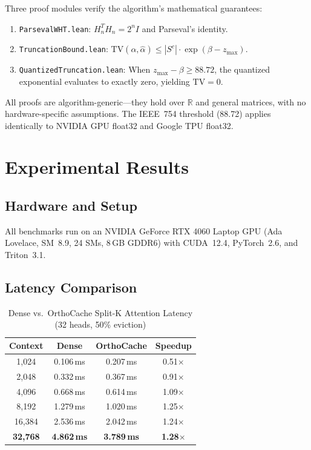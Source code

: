 \documentclass[conference]{IEEEtran}
\begin{document}
Three proof modules verify the algorithm's mathematical guarantees:

\begin{enumerate}
\item \texttt{ParsevalWHT.lean}: $H_n^T H_n = 2^n I$ and Parseval's identity.
\item \texttt{TruncationBound.lean}: $\text{TV}(\alpha, \hat{\alpha}) \leq |S^c| \cdot \exp(\beta - z_{\max})$.
\item \texttt{QuantizedTruncation.lean}: When $z_{\max} - \beta \geq 88.72$, the quantized exponential evaluates to exactly zero, yielding $\text{TV} = 0$.
\end{enumerate}

All proofs are algorithm-generic---they hold over $\mathbb{R}$ and
general matrices, with no hardware-specific assumptions. The IEEE~754
threshold (88.72) applies identically to NVIDIA GPU float32 and
Google TPU float32.


\section{Experimental Results}\label{sec:results}

\subsection{Hardware and Setup}

All benchmarks run on an NVIDIA GeForce RTX 4060 Laptop GPU (Ada
Lovelace, SM~8.9, 24 SMs, 8\,GB GDDR6) with CUDA~12.4, PyTorch~2.6,
and Triton~3.1.

\subsection{Latency Comparison}

\begin{table}[h]
\centering
\caption{Dense vs.\ OrthoCache Split-K Attention Latency (32 heads, 50\% eviction)}
\label{tab:latency}
\begin{tabular}{@{}cccc@{}}
\toprule
Context & Dense & OrthoCache & Speedup \\
\midrule
1,024  & 0.106\,ms & 0.207\,ms & 0.51$\times$ \\
2,048  & 0.332\,ms & 0.367\,ms & 0.91$\times$ \\
4,096  & 0.668\,ms & 0.614\,ms & 1.09$\times$ \\
8,192  & 1.279\,ms & 1.020\,ms & 1.25$\times$ \\
16,384 & 2.536\,ms & 2.042\,ms & 1.24$\times$ \\
\textbf{32,768} & \textbf{4.862\,ms} & \textbf{3.789\,ms} & \textbf{1.28$\times$} \\
\bottomrule
\end{tabular}
\end{table}
\end{document}
